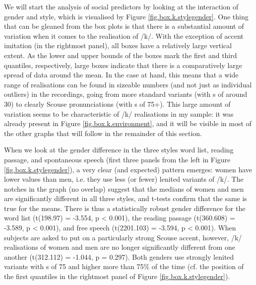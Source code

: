 We will start the analysis of social predictors by looking at the interaction of gender and style, which is visualised by Figure \ref{fig.box.k.stylegender}.
One thing that can be gleaned from the box plots is that there is a substantial amount of variation when it comes to the realisation of /k/.
With the exception of accent imitation (in the rightmost panel), all boxes have a relatively large vertical extent.
As the lower and upper bounds of the boxes mark the first and third quantiles, respectively, large boxes indicate that there is a comparatively large spread of data around the mean.
In the case at hand, this means that a wide range of realisations can be found in sizeable numbers (and not just as individual outliers) in the recordings, going from more standard variants (with s of around 30) to clearly Scouse pronunciations (with s of 75+).
This large amount of variation seems to be characteristic of /k/ realisations in my sample: it was already present in Figure \ref{fig.box.k.environment}, and it will be visible in most of the other graphs that will follow in the remainder of this section.

When we look at the gender difference in the three styles word list, reading passage, and spontaneous speech (first three panels from the left in Figure \ref{fig.box.k.stylegender}), a very clear (and expected) pattern emerges: women have lower  values than men, i.e. they use less (or fewer) lenited variants of /k/.
The notches in the graph (no overlap) suggest that the medians of women and men are significantly different in all three styles, and t-tests confirm that the same is true for the means.
There is thus a statistically robust gender difference for the word list (t(198.97) = -3.554, p < 0.001), the reading passage (t(360.608) = -3.589, p < 0.001), and free speech (t(2201.103) = -3.594, p < 0.001).
When subjects are asked to put on a particularly strong Scouse accent, however, /k/ realisations of women and men are no longer significantly different from one another (t(312.112) = -1.044, p = 0.297).
Both genders use strongly lenited variants with s of 75 and higher more than 75\% of the time (cf. the position of the first quantiles in the rightmost panel of Figure \ref{fig.box.k.stylegender}).

